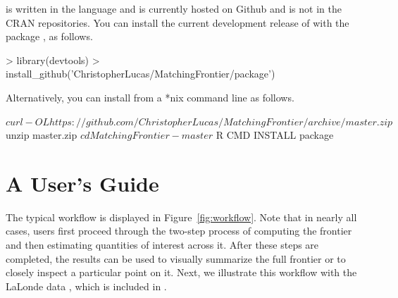 \documentclass[nojss]{jss}
\begin{document}
 is written in the  language
\citep{r2012} and is currently hosted on Github and
is not in the CRAN repositories. You can install the current
development release of  with the 
package \citep{wickham2013}, as follows.

\begin{Code}
> library(devtools) 
> install_github('ChristopherLucas/MatchingFrontier/package')
\end{Code} 

Alternatively, you can install  from a *nix command
line as follows.

\begin{Code}
$ curl -OL https://github.com/ChristopherLucas/MatchingFrontier/archive/master.zip
$ unzip master.zip
$ cd MatchingFrontier-master
$ R CMD INSTALL package
\end{Code} 

\section[A User's Guide]{A User's Guide}

The typical  workflow is displayed in
Figure~\ref{fig:workflow}. Note that in nearly all cases, users first
proceed through the two-step process of computing the frontier and
then estimating quantities of interest across it. After these steps
are completed, the results can be used to visually summarize the full
frontier or to closely inspect a particular point on it.  Next, we
illustrate this workflow with the LaLonde data
\citep{lalonde1986,dehejia1999}, which is included in
.
\end{document}
